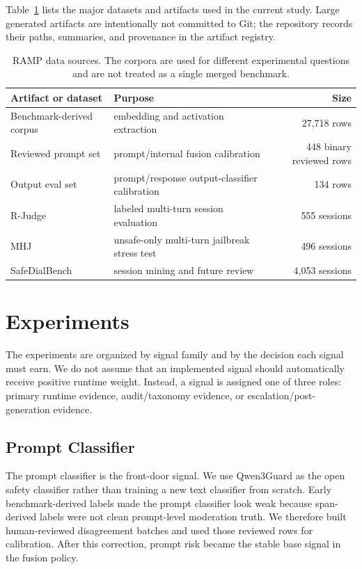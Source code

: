\documentclass[11pt]{article}
\begin{document}
Table~\ref{tab:data} lists the major datasets and artifacts used in the current study. Large generated artifacts
are intentionally not committed to Git; the repository records their paths, summaries, and
provenance in the artifact registry.

\begin{table}[H]
\centering
\begin{tabular}{llr}
\toprule
Artifact or dataset & Purpose & Size \\
\midrule
Benchmark-derived corpus & embedding and activation extraction & 27,718 rows \\
Reviewed prompt set & prompt/internal fusion calibration & 448 binary reviewed rows \\
Output eval set & prompt/response output-classifier calibration & 134 rows \\
R-Judge & labeled multi-turn session evaluation & 555 sessions \\
MHJ & unsafe-only multi-turn jailbreak stress test & 496 sessions \\
SafeDialBench & session mining and future review & 4,053 sessions \\
\bottomrule
\end{tabular}
\caption{RAMP data sources. The corpora are used for different experimental questions and are not
treated as a single merged benchmark.}
\label{tab:data}
\end{table}

\section{Experiments}

The experiments are organized by signal family and by the decision each signal must earn. We do not
assume that an implemented signal should automatically receive positive runtime weight. Instead, a
signal is assigned one of three roles: primary runtime evidence, audit/taxonomy evidence, or
escalation/post-generation evidence.

\subsection{Prompt Classifier}

The prompt classifier is the front-door signal. We use Qwen3Guard as the open safety classifier
rather than training a new text classifier from scratch. Early benchmark-derived labels made the
prompt classifier look weak because span-derived labels were not clean prompt-level moderation
truth. We therefore built human-reviewed disagreement batches and used those reviewed rows for
calibration. After this correction, prompt risk became the stable base signal in the fusion policy.
\end{document}
